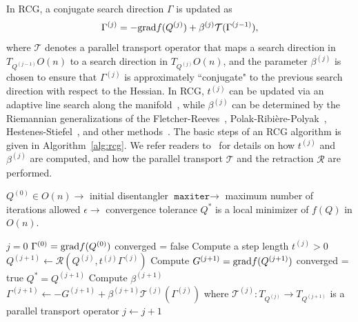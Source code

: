 \documentclass[pdflatex,sn-mathphys-num]{sn-jnl}
\newcounter{thm}[section]
\begin{document}
In RCG, a conjugate search direction $\Gamma$ is updated as
\begin{equation}
\Gamma^{(j)} = -{\rm grad}f(Q^{(j)}) + \beta^{(j)} \mathcal{T}(\Gamma^{(j-1)}),
\end{equation}
where $\mathcal{T}$ denotes a parallel transport operator that maps a search direction in $T_{Q^{(j-1)}}O(n)$ to a search direction in $T_{Q^{(j)}}O(n)$, and the parameter $\beta^{(j)}$ is chosen to ensure that $\Gamma^{(j)}$ is approximately ``conjugate" to the previous search direction with respect to the Hessian. In RCG, $t^{(j)}$ can be updated via an adaptive line search along the manifold~\cite{Sato2022}, while $\beta^{(j)}$ can be determined by the Riemannian generalizations of the Fletcher-Reeves~\cite{fletcher_reeves},  Polak-Ribi\`ere-Polyak~\cite{polak_ribiere,polyakConjugateGradientMethod1969}, Hestenes-Stiefel~\cite{hestenesMethodsConjugateGradients}, and other methods~\cite{daiyuan99,liustorey91}. The basic steps of an RCG algorithm is given in Algorithm~\ref{alg:rcg}. We refer readers to~\cite{Sato2022} for details on how $t^{(j)}$ and $\beta^{(j)}$ are computed, and how the parallel transport $\mathcal{T}$ and the retraction $\mathcal{R}$ are performed. 
%
\begin{algorithm} \label{alg:rcg}
 \caption{A Riemannian conjugate gradient (RCG) algorithm.} 
\begin{algorithmic}[1]
\Require 
\Statex $Q^{(0)} \in O(n) \rightarrow$ initial disentangler
\Statex $\texttt{maxiter} \rightarrow$ maximum number of iterations allowed 
\Statex $\epsilon \rightarrow$ convergence tolerance 
%
\Ensure $Q^*$ is a local minimizer of $f(Q)$ in $O(n)$.

\State $j=0$
\State $\Gamma^{(0)} = {\rm grad} f(Q^{(0)})$
\State converged = false
   \State Compute a step length $t^{(j)} > 0$
   \State $Q^{(j+1)} \leftarrow \mathcal{R}(Q^{(j)},t^{(j)}\Gamma^{(j)})$
   \State Compute $G^{(j+1)} = {\rm grad}f(Q^{(j+1)})$
      \State converged = true
      \State $Q^* = Q^{(j+1)}$
   \Else
      \State Compute $\beta^{(j+1)}$
      \State $\Gamma^{(j+1)} \leftarrow -G^{(j+1)} + \beta^{(j+1)} \mathcal{T}^{(j)}(\Gamma^{(j)})$ 
      where $\mathcal{T}^{(j)}:T_{Q^{(j)}}\rightarrow T_{Q^{(j+1)}}$ is a parallel transport operator
   \EndIf
\State $j \leftarrow j + 1$
\EndWhile
\end{algorithmic}
\end{algorithm}
\end{document}

